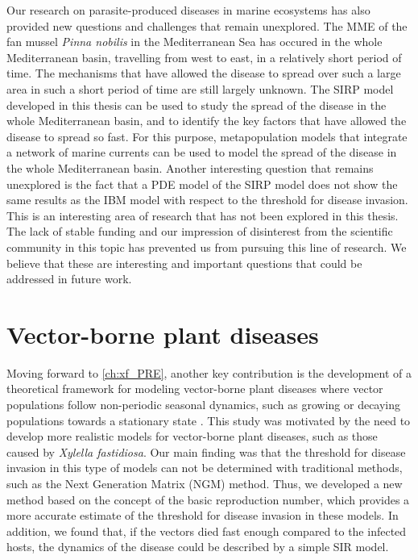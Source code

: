 Our research on parasite-produced diseases in marine ecosystems has also
provided new questions and challenges that remain unexplored. The MME of the
fan mussel \textit{Pinna nobilis} in the Mediterranean Sea has occured
in the whole Mediterranean basin, travelling from west to east, in a relatively
short period of time. The mechanisms that have allowed the disease to spread
over such a large area in such a short period of time are still largely
unknown. The SIRP model developed in this thesis can be used to study the
spread of the disease in the whole Mediterranean basin, and to identify the key
factors that have allowed the disease to spread so fast. For this purpose,
metapopulation models that integrate a network of marine currents can be used
to model the spread of the disease in the whole Mediterranean basin. Another
interesting question that remains unexplored is the fact that a PDE model of
the SIRP model does not show the same results as the IBM model with respect to
the threshold for disease invasion. This is an interesting area of research
that has not been explored in this thesis. The lack of stable funding and our
impression of disinterest from the scientific community in this topic has
prevented us from pursuing this line of research. We believe that these are
interesting and important questions that could be addressed in future work.

\section{Vector-borne plant diseases}

Moving forward to \cref{ch:xf_PRE}, another key contribution is the
development of a theoretical framework for modeling vector-borne plant diseases
where vector populations follow non-periodic seasonal dynamics, such as growing
or decaying populations towards a stationary state
\cite{GimenezRomero2022_PRE}. This study was motivated by the need to develop
more realistic models for vector-borne plant diseases, such as those caused by
\textit{Xylella fastidiosa}. Our main finding was that the threshold for
disease invasion in this type of models can not be determined with traditional
methods, such as the Next Generation Matrix (NGM) method. Thus, we developed a
new method based on the concept of the basic reproduction number, which
provides a more accurate estimate of the threshold for disease invasion in
these models. In addition, we found that, if the vectors died fast enough
compared to the infected hosts, the dynamics of the disease could be described
by a simple SIR model.

